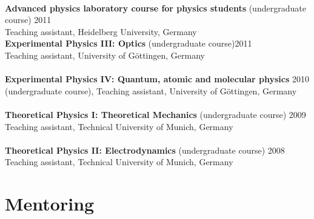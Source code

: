 \documentclass[margin,line]{res}
\begin{document}
\begin{resume}
\vspace*{-3mm}\\
{\bf Advanced physics laboratory course for physics students} (undergraduate course) \hfill {2011}\\
Teaching assistant, Heidelberg University, Germany\\
{\bf Experimental Physics III: Optics}  (undergraduate course)\hfill {2011}\\
Teaching assistant, University of Göttingen, Germany \\
\vspace*{-3mm}\\
{\bf Experimental Physics IV: Quantum, atomic and molecular physics}  \hfill {2010}\\
(undergraduate course), Teaching assistant, University of Göttingen, Germany\\
\vspace*{-3mm}\\
{\bf Theoretical Physics I: Theoretical Mechanics} (undergraduate course) \hfill {2009}\\
Teaching assistant, Technical University of Munich, Germany\\
\vspace*{-3mm}\\
{\bf Theoretical Physics II: Electrodynamics} (undergraduate course) \hfill {2008}\\
Teaching assistant, Technical University of Munich, Germany


\section{\sc Mentoring}


\end{resume}
\end{document}
